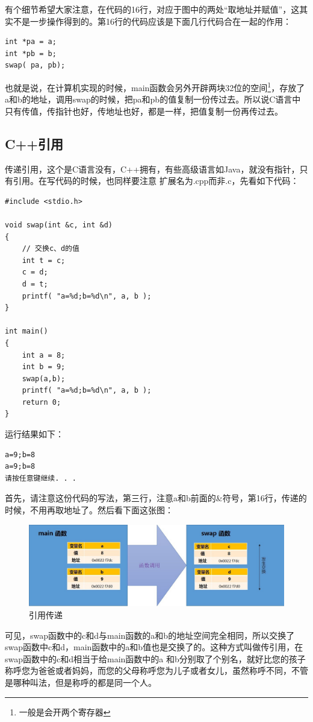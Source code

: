 \documentclass[11pt,twoside,a4paper,titlepage]{article}	%
\begin{document}
有个细节希望大家注意，在代码的16行，对应于图中的两处“取地址并赋值”，这其实不是一步操作得到的。第16行的代码应该是下面几行代码合在一起的作用：
\begin{lstlisting}
int *pa = a;
int *pb = b;
swap( pa, pb);
\end{lstlisting}

也就是说，在计算机实现的时候，main函数会另外开辟两块32位的空间\footnote{一般是会开两个寄存器}，存放了a和b的地址，调用swap的时候，把pa和pb的值复制一份传过去。所以说C语言中只有传值，传指针也好，传地址也好，都是一样，把值复制一份再传过去。

\subsection{C++引用}
传递引用，这个是C语言没有，C++拥有，有些高级语言如Java，就没有指针，只有引用。在写代码的时候，也同样要注意{\color{red} 扩展名为.cpp而非.c}，先看如下代码：
\begin{lstlisting}
#include <stdio.h>

void swap(int &c, int &d)
{
	// 交换c、d的值
	int t = c;
	c = d;
	d = t;
	printf( "a=%d;b=%d\n", a, b );
}

int main()
{
	int a = 8;
	int b = 9;
	swap(a,b);
	printf( "a=%d;b=%d\n", a, b );
	return 0;
}
\end{lstlisting}

运行结果如下：
\begin{lstlisting}
a=9;b=8
a=9;b=8
请按任意键继续. . .
\end{lstlisting}

首先，请注意这份代码的写法，第三行，注意a和b前面的\&符号，第16行，传递的时候，不用再取地址了。然后看下面这张图：

\begin{figure}[bpht]
\centering
\includegraphics[scale=.5]{../src/swap_04.jpg}
\caption{引用传递}
\label{fig:swap_04}
\end{figure}

可见，swap函数中的c和d与main函数的a和b的地址空间完全相同，所以交换了swap函数中c和d，main函数中的a和b值也是交换了的。这种方式叫做传引用，在swap函数中的c和d相当于给main函数中的a 和b分别取了个别名，就好比您的孩子称呼您为爸爸或者妈妈，而您的父母称呼您为儿子或者女儿，虽然称呼不同，不管是哪种叫法，但是称呼的都是同一个人。
\end{document}
